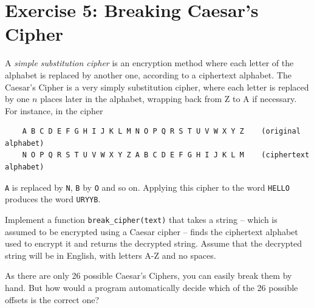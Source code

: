 \documentclass{article}
\begin{document}
\section*{Exercise 5: Breaking Caesar's Cipher}

A \emph{simple substitution cipher} is an encryption method where each letter of the alphabet is replaced by another one, according to a ciphertext alphabet. The Caesar's Cipher is a very simply substitution cipher, where each letter is replaced by one $n$ places later in the alphabet, wrapping back from Z to A if necessary.
For instance, in the cipher
\begin{verbatim}
    A B C D E F G H I J K L M N O P Q R S T U V W X Y Z    (original alphabet)
    N O P Q R S T U V W X Y Z A B C D E F G H I J K L M    (ciphertext alphabet)
\end{verbatim}
\texttt{A} is replaced by \texttt{N}, \texttt{B} by \texttt{O} and so on. Applying this cipher to the word \texttt{HELLO} produces the word \texttt{URYYB}. 

Implement a function \texttt{break\_cipher(text)} that takes a string
-- which is assumed to be encrypted using a Caesar cipher -- finds the
ciphertext alphabet used to encrypt it and returns the decrypted
string. Assume that the decrypted string will be in English, with
letters A-Z and no spaces.

As there are only 26 possible Caesar's Ciphers, you can easily break
them by hand.  But how would a program automatically decide which of the 26 possible
offsets is the correct one?
\end{document}
